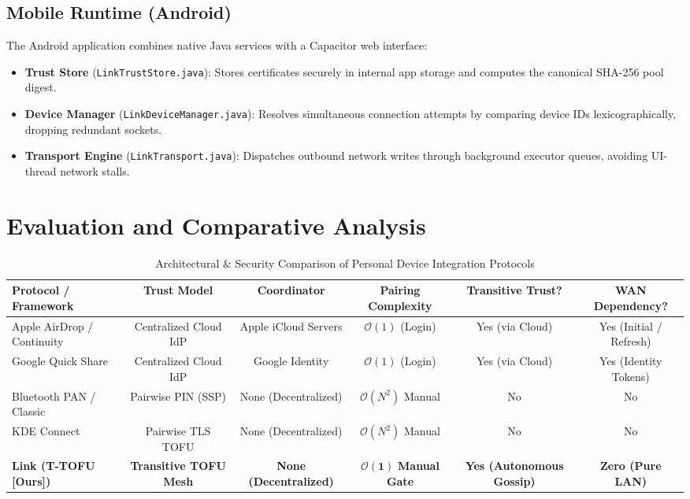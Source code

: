 \documentclass[conference]{IEEEtran}
\begin{document}
\subsection{Mobile Runtime (Android)}
The Android application combines native Java services with a Capacitor web interface:
\begin{itemize}
    \item \textbf{Trust Store} (\texttt{LinkTrustStore.java}): Stores certificates securely in internal app storage and computes the canonical SHA-256 pool digest.
    \item \textbf{Device Manager} (\texttt{LinkDeviceManager.java}): Resolves simultaneous connection attempts by comparing device IDs lexicographically, dropping redundant sockets.
    \item \textbf{Transport Engine} (\texttt{LinkTransport.java}): Dispatches outbound network writes through background executor queues, avoiding UI-thread network stalls.
\end{itemize}

\section{Evaluation and Comparative Analysis}

\begin{table}[t]
\caption{Architectural \& Security Comparison of Personal Device Integration Protocols}
\label{tab:comparison}
\centering
\begin{tabular}{@{}lccccc@{}}
\toprule
\textbf{Protocol / Framework} & \textbf{Trust Model} & \textbf{Coordinator} & \textbf{Pairing Complexity} & \textbf{Transitive Trust?} & \textbf{WAN Dependency?} \\ \midrule
Apple AirDrop / Continuity    & Centralized Cloud IdP & Apple iCloud Servers & $\mathcal{O}(1)$ (Login)    & Yes (via Cloud)            & Yes (Initial / Refresh)  \\
Google Quick Share            & Centralized Cloud IdP & Google Identity      & $\mathcal{O}(1)$ (Login)    & Yes (via Cloud)            & Yes (Identity Tokens)    \\
Bluetooth PAN / Classic       & Pairwise PIN (SSP)    & None (Decentralized) & $\mathcal{O}(N^2)$ Manual   & No                         & No                       \\
KDE Connect                   & Pairwise TLS TOFU     & None (Decentralized) & $\mathcal{O}(N^2)$ Manual   & No                         & No                       \\
\textbf{Link (T-TOFU [Ours])} & \textbf{Transitive TOFU Mesh} & \textbf{None (Decentralized)} & $\mathbf{\mathcal{O}(1)}$ \textbf{Manual Gate} & \textbf{Yes (Autonomous Gossip)} & \textbf{Zero (Pure LAN)} \\ \bottomrule
\end{tabular}
\end{table}
\end{document}
